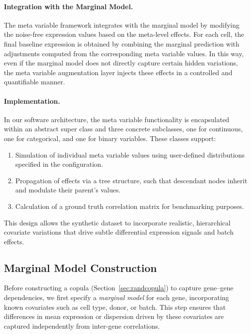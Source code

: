 \documentclass{article}
\begin{document}
\paragraph{Integration with the Marginal Model.}
The meta variable framework integrates with the marginal model by modifying the noise-free expression values based on the meta-level effects. For each cell, the final baseline expression is obtained by combining the marginal prediction with adjustments computed from the corresponding meta variable values. In this way, even if the marginal model does not directly capture certain hidden variations, the meta variable augmentation layer injects these effects in a controlled and quantifiable manner.

\paragraph{Implementation.}
In our software architecture, the meta variable functionality is encapsulated within an abstract super class and three concrete subclasses, one for continuous, one for categorical, and one for binary variables. These classes support:
\begin{enumerate}
	\item Simulation of individual meta variable values using user-defined distributions specified in the configuration.
	\item Propagation of effects via a tree structure, such that descendant nodes inherit and modulate their parent’s values.
	\item Calculation of a ground truth correlation matrix for benchmarking purposes.
\end{enumerate}
This design allows the synthetic dataset to incorporate realistic, hierarchical covariate variations that drive subtle differential expression signals and batch effects.



\subsection{Marginal Model Construction}
\label{sec:marginalmodel}

Before constructing a copula (Section~\ref{sec:randcopula}) to capture gene--gene dependencies, we first specify a \emph{marginal model} for each gene, incorporating known covariates such as cell type, donor, or batch. This step ensures that differences in mean expression or dispersion driven by these covariates are captured independently from inter-gene correlations.
\end{document}
